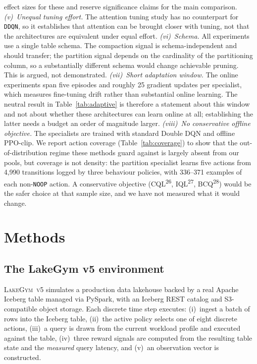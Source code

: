 \documentclass[fleqn,10pt]{wlscirep}
\newcommand{\env}{\textsc{LakeGym~v5}}
\newcommand{\ddqn}{\texttt{DDQN}}
\newcommand{\noop}{\texttt{NOOP}}
\begin{document}
effect sizes for these and reserve significance claims for the main
comparison.
\emph{(v)~Unequal tuning effort.} The attention tuning study has no
counterpart for \ddqn{}, so it establishes that attention can be brought
closer with tuning, not that the architectures are equivalent under
equal effort.
\emph{(vi)~Schema.} All experiments use a single table schema. The
compaction signal is schema-independent and should transfer; the
partition signal depends on the cardinality of the partitioning column,
so a substantially different schema would change achievable pruning.
This is argued, not demonstrated.
\emph{(vii)~Short adaptation window.} The online experiments span five
episodes and roughly 25 gradient updates per specialist, which measures
fine-tuning drift rather than substantial online learning. The neutral
result in Table~\ref{tab:adaptive} is therefore a statement about this
window and not about whether these architectures can learn online at
all; establishing the latter needs a budget an order of magnitude
larger.
\emph{(viii)~No conservative offline objective.} The specialists are
trained with standard Double DQN and offline PPO-clip. We report action
coverage (Table~\ref{tab:coverage}) to show that the out-of-distribution
regime these methods guard against is largely absent from our pools, but
coverage is not density: the partition specialist learns five actions
from 4{,}990 transitions logged by three behaviour policies, with
336--371 examples of each non-\noop{} action. A conservative objective
(CQL\textsuperscript{26}, IQL\textsuperscript{27},
BCQ\textsuperscript{28}) would be the safer choice at that sample size,
and we have not measured what it would change.

\FloatBarrier

\section*{Methods}
\label{sec:methods}

\subsection*{The LakeGym v5 environment}

\env{} simulates a production data lakehouse backed by a real Apache
Iceberg table managed via PySpark, with an Iceberg REST catalog and
S3-compatible object storage. Each discrete time step executes:
(i)~ingest a batch of rows into the Iceberg table,
(ii)~the active policy selects one of eight discrete actions,
(iii)~a query is drawn from the current workload profile and executed
against the table, (iv)~three reward signals are computed from the
resulting table state and the \emph{measured} query latency, and
(v)~an observation vector is constructed.
\end{document}
